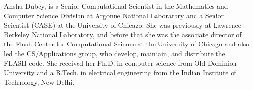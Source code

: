 \documentclass{IEEEcsmag}
\begin{document}
\begin{IEEEbiography}{Anshu Dubey,} is a Senior Computational Scientist in the Mathematics and Computer Science Division at Argonne National Laboratory and a Senior Scientist
(CASE) at the University of Chicago. She was previously at Lawrence Berkeley National Laboratory, and before that she was the associate director of the Flash Center for Computational Science at the University of Chicago and also led the CS/Applications
group, who develop, maintain, and distribute the FLASH code. She
received her Ph.D. in computer science from Old Dominion University and
a B.Tech. in electrical engineering from the Indian Institute of Technology,
New Delhi.\vspace*{8pt}
\end{IEEEbiography}
\end{document}
